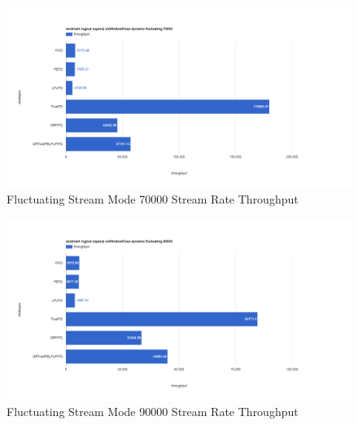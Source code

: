 \begin{figure}[!htbp]
    \centering
    \includegraphics[width=\textwidth]{img/app3-f-70000-t.png}
    \caption{Fluctuating Stream Mode 70000 Stream Rate Throughput}
\end{figure}
\begin{figure}[!htbp]
    \centering
    \includegraphics[width=\textwidth]{img/app3-f-90000-t.png}
    \caption{Fluctuating Stream Mode 90000 Stream Rate Throughput}
\end{figure}